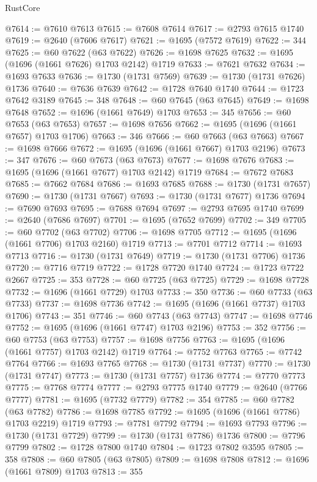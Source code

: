 \begin{lexlean}{RustCore}
\begin{coremodule}
@7614 := @7610 @7613
@7615 := @7608 @7614
@7617 := @2793 @7615 @1740
@7619 := @2640 (@7606 @7617)
@7621 := @1695 (@7572 @7619)
@7622 := 344
@7625 := @60 @7622 (@63 @7622)
@7626 := @1698 @7625
@7632 := @1695 (@1696 (@1661 @7626) @1703 @2142) @1719
@7633 := @7621 @7632
@7634 := @1693 @7633
@7636 := @1730 (@1731 @7569)
@7639 := @1730 (@1731 @7626) @1736
@7640 := @7636 @7639
@7642 := @1728 @7640 @1740
@7644 := @1723 @7642 @3189
@7645 := 348
@7648 := @60 @7645 (@63 @7645)
@7649 := @1698 @7648
@7652 := @1696 (@1661 @7649) @1703
@7653 := 345
@7656 := @60 @7653 (@63 @7653)
@7657 := @1698 @7656
@7662 := @1695 (@1696 (@1661 @7657) @1703 @1706)
@7663 := 346
@7666 := @60 @7663 (@63 @7663)
@7667 := @1698 @7666
@7672 := @1695 (@1696 (@1661 @7667) @1703 @2196)
@7673 := 347
@7676 := @60 @7673 (@63 @7673)
@7677 := @1698 @7676
@7683 := @1695 (@1696 (@1661 @7677) @1703 @2142) @1719
@7684 := @7672 @7683
@7685 := @7662 @7684
@7686 := @1693 @7685
@7688 := @1730 (@1731 @7657)
@7690 := @1730 (@1731 @7667)
@7693 := @1730 (@1731 @7677) @1736
@7694 := @7690 @7693
@7695 := @7688 @7694
@7697 := @2793 @7695 @1740
@7699 := @2640 (@7686 @7697)
@7701 := @1695 (@7652 @7699)
@7702 := 349
@7705 := @60 @7702 (@63 @7702)
@7706 := @1698 @7705
@7712 := @1695 (@1696 (@1661 @7706) @1703 @2160) @1719
@7713 := @7701 @7712
@7714 := @1693 @7713
@7716 := @1730 (@1731 @7649)
@7719 := @1730 (@1731 @7706) @1736
@7720 := @7716 @7719
@7722 := @1728 @7720 @1740
@7724 := @1723 @7722 @2667
@7725 := 353
@7728 := @60 @7725 (@63 @7725)
@7729 := @1698 @7728
@7732 := @1696 (@1661 @7729) @1703
@7733 := 350
@7736 := @60 @7733 (@63 @7733)
@7737 := @1698 @7736
@7742 := @1695 (@1696 (@1661 @7737) @1703 @1706)
@7743 := 351
@7746 := @60 @7743 (@63 @7743)
@7747 := @1698 @7746
@7752 := @1695 (@1696 (@1661 @7747) @1703 @2196)
@7753 := 352
@7756 := @60 @7753 (@63 @7753)
@7757 := @1698 @7756
@7763 := @1695 (@1696 (@1661 @7757) @1703 @2142) @1719
@7764 := @7752 @7763
@7765 := @7742 @7764
@7766 := @1693 @7765
@7768 := @1730 (@1731 @7737)
@7770 := @1730 (@1731 @7747)
@7773 := @1730 (@1731 @7757) @1736
@7774 := @7770 @7773
@7775 := @7768 @7774
@7777 := @2793 @7775 @1740
@7779 := @2640 (@7766 @7777)
@7781 := @1695 (@7732 @7779)
@7782 := 354
@7785 := @60 @7782 (@63 @7782)
@7786 := @1698 @7785
@7792 := @1695 (@1696 (@1661 @7786) @1703 @2219) @1719
@7793 := @7781 @7792
@7794 := @1693 @7793
@7796 := @1730 (@1731 @7729)
@7799 := @1730 (@1731 @7786) @1736
@7800 := @7796 @7799
@7802 := @1728 @7800 @1740
@7804 := @1723 @7802 @3595
@7805 := 358
@7808 := @60 @7805 (@63 @7805)
@7809 := @1698 @7808
@7812 := @1696 (@1661 @7809) @1703
@7813 := 355

\end{coremodule}
\end{lexlean}
